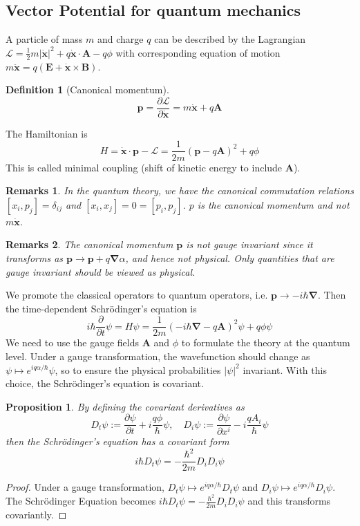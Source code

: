 \documentclass[a4paper]{article}
\newtheorem{remarks}{Remarks}[section]
\theoremstyle{new}
\newtheorem{defi}{Definition}[section]
\newtheorem{prop}{Proposition}[section]
\begin{document}
\subsection{Vector Potential for quantum mechanics}
A particle of mass $m$ and charge $q$ can be described by the Lagrangian $\mathcal{L}=\frac{1}{2}m|\mathbf{\dot{x}}|^2+q\mathbf{\dot{x}}\cdot\mathbf{A}-q\phi$ with corresponding equation of motion $m\mathbf{\ddot{x}}=q(\mathbf{E}+\mathbf{\dot{x}}\times\mathbf{B})$. 
\begin{defi}[Canonical momentum]
$$\mathbf{p}=\frac{\partial\mathcal{L}}{\partial\mathbf{\dot{x}}}=m\mathbf{\dot{x}}+q\mathbf{A}$$
\end{defi}
The Hamiltonian is 
$$H=\mathbf{\dot{x}}\cdot\mathbf{p}-\mathcal{L}=\frac{1}{2m}(\mathbf{p}-q\mathbf{A})^2+q\phi$$
This is called minimal coupling (shift of kinetic energy to include $\mathbf{A}$). 
\begin{remarks}
In the quantum theory, we have the canonical commutation relations $[x_i,p_j]=\delta_{ij}$ and $[x_i,x_j]=0=[p_i,p_j]$. $p$ is the canonical momentum and not $m\mathbf{\dot{x}}$.
\end{remarks}
\begin{remarks}
The canonical momentum $\mathbf{p}$ is not gauge invariant since it transforms as $\mathbf{p}\rightarrow\mathbf{p}+q\boldsymbol{\nabla}\alpha$, and hence not physical. Only quantities that are gauge invariant should be viewed as physical. 
\end{remarks}
We promote the classical operators to quantum operators, i.e. $\mathbf{p}\rightarrow -i\hbar\boldsymbol{\nabla}$. Then the time-dependent Schr\"{o}dinger's equation is
$$i\hbar\frac{\partial}{\partial t}\psi=H\psi=\frac{1}{2m}(-i\hbar\boldsymbol{\nabla}-q\mathbf{A})^2\psi+q\phi\psi$$
We need to use the gauge fields $\mathbf{A}$ and $\phi$ to formulate the theory at the quantum level. Under a gauge transformation, the wavefunction should change as $\psi\mapsto e^{iq\alpha/\hbar}\psi$, so to ensure the physical probabilities $|\psi|^2$ invariant. With this choice, the Schr\"{o}dinger's equation is covariant. 
\begin{prop}
By defining the covariant derivatives as 
$$D_t\psi:=\frac{\partial\psi}{\partial t}+i\frac{q\phi}{\hbar}\psi,\quad D_i\psi:=\frac{\partial\psi}{\partial x^i}-i\frac{qA_i}{\hbar}\psi$$
then the Schr\"{o}dinger's equation has a covariant form
$$i\hbar D_t\psi=-\frac{\hbar^2}{2m}D_iD_i\psi$$
\end{prop}
\begin{proof}
Under a gauge transformation, $D_t\psi\mapsto e^{iq\alpha/\hbar}D_t\psi$ and $D_i\psi\mapsto e^{iq\alpha/\hbar}D_i\psi$. The Schr\"{o}dinger Equation becomes $i\hbar D_t\psi=-\frac{\hbar^2}{2m}D_iD_i\psi$ and this transforms covariantly.
\end{proof}
\end{document}
